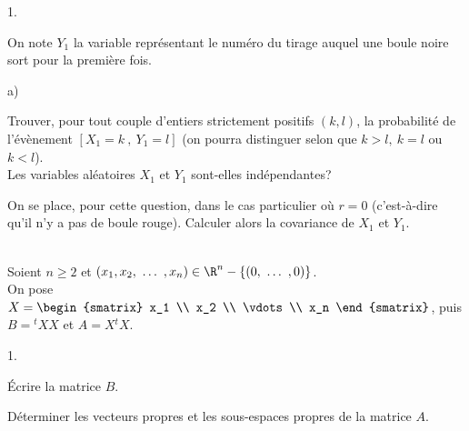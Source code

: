 \documentclass[11pt]{article}%
\begin{document}
\begin{exerciceAP}
\begin{noliste}{1.}
  \item On note $Y_1$ la variable représentant le numéro du tirage
    auquel une boule noire sort pour la première fois.
    \begin{noliste}{a)}
    \setlength{\itemsep}{2mm}
    \item Trouver, pour tout couple d'entiers strictement positifs
      $(k,l)$, la probabilité de l'évènement $[ X_1 = k\ ,\ Y_1 = l]$
      (on pourra distinguer selon que $k > l,\ k=l$ ou $k < l$). \\
      Les variables aléatoires $X_1$ et $Y_1$ sont-elles
      indépendantes?
    \item On se place, pour cette question, dans le cas particulier où
      $r=0$ (c'est-à-dire qu'il n'y a pas de boule rouge). Calculer
      alors la covariance de $X_1$ et $Y_1$.
    \end{noliste} 
  \end{noliste}
\end{exerciceAP}


\begin{exerciceSP}~\\
  Soient $n \geq 2$ et $(x_1 , x_2,\ \dots\ , x_n) \in \R^n - \{(0,\
  \dots\ ,0) \}$. \\
  On pose $X = 
  \begin{smatrix} 
    x_1 \\
    x_2 \\ 
    \vdots \\
    x_n
  \end{smatrix}$, puis $B = {}^tX X$ et $A = X {}^t X$.
  \begin{noliste}{1.}
    \setlength{\itemsep}{2mm}
  \item Écrire la matrice $B$.
  \item Déterminer les vecteurs propres et les sous-espaces propres de
    la matrice $A$.
  \end{noliste}
\end{exerciceSP}

\end{document}
